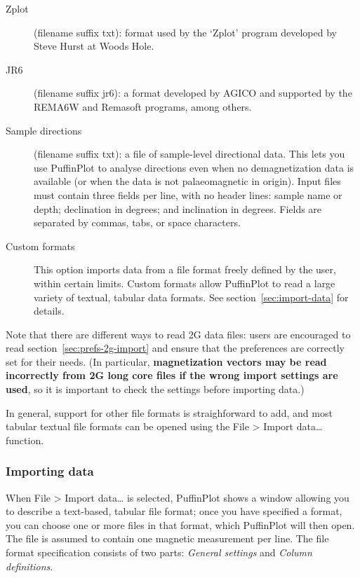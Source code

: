 \documentclass[a4paper,british]{article}
\newcommand{\ppcmd}[1]{\textsf{#1}} %
\newcommand{\caps}[1]{\MakeTextUppercase{#1}} %
\newcommand{\submenu}{ \textgreater{} } %
\begin{document}
\begin{description}
\item[Zplot] (filename suffix \ppcmd{txt}): format used by the 
  `Zplot' program developed by Steve Hurst at Woods Hole.

\item[JR6] (filename suffix \ppcmd{jr6}): a format developed by AGICO
  and supported by the REMA6W and Remasoft programs, among others.
  
\item[Sample directions] (filename suffix \ppcmd{txt}): a file of
  sample-level directional data. This lets you use PuffinPlot to analyse
  directions even when no demagnetization data is available (or when the
  data is not palaeomagnetic in origin). Input files must contain three
  fields per line, with no header lines: sample name or depth;
  declination in degrees; and inclination in degrees. Fields are
  separated by commas, tabs, or space characters.

\item[Custom formats] This option imports data from a file format freely
  defined by the user, within certain limits. Custom formats allow
  PuffinPlot to read a large variety of textual, tabular data formats.
  See section~\ref{sec:import-data} for details.

\end{description}

\noindent Note that there are different ways to read 2\caps{g} data
files: users are encouraged to read section~\ref{sec:prefs-2g-import}
and ensure that the preferences are correctly set for their needs. (In
particular, \textbf{magnetization vectors may be read incorrectly from
  2G long core files if the wrong import settings are used}, so it is
important to check the settings before importing data.)

In general, support for other file formats is straighforward to add, and most
tabular textual file formats can be opened using the \ppcmd{File\submenu
  Import data\ldots} function.

\subsubsection{\label{sec:import-data}Importing data}

When \ppcmd{File\submenu Import data\ldots} is selected, PuffinPlot
shows a window allowing you to describe a text-based, tabular file
format; once you have specified a format, you can choose one or more
files in that format, which PuffinPlot will then open. The file is
assumed to contain one magnetic measurement per line. The file format
specification consists of two parts: \emph{General settings} and
\emph{Column definitions}.
\end{document}
